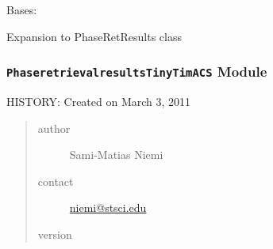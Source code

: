 \documentclass[letterpaper,10pt,english]{sphinxmanual}
\begin{document}
\begin{fulllineitems}
\label{SamPy.focus:SamPy.focus.PhaseretrievalresultsTinyTim.TinyTimResults}
Bases: 

Expansion to PhaseRetResults class


\begin{fulllineitems}
\label{SamPy.focus:SamPy.focus.PhaseretrievalresultsTinyTim.TinyTimResults.findRealFocus}
\end{fulllineitems}



\begin{fulllineitems}
\label{SamPy.focus:SamPy.focus.PhaseretrievalresultsTinyTim.TinyTimResults.plotFocusDifference}
\end{fulllineitems}



\begin{fulllineitems}
\label{SamPy.focus:SamPy.focus.PhaseretrievalresultsTinyTim.TinyTimResults.plotFocusFieldPosition}
\end{fulllineitems}


\end{fulllineitems}



\subsubsection{\texttt{PhaseretrievalresultsTinyTimACS} Module}
\label{SamPy.focus:phaseretrievalresultstinytimacs-module}\label{SamPy.focus:module-SamPy.focus.PhaseretrievalresultsTinyTimACS}
HISTORY:
Created on March 3, 2011
\begin{quote}\begin{description}
\item[{author}] \leavevmode
Sami-Matias Niemi

\item[{contact}] \leavevmode
\href{mailto:niemi@stsci.edu}{niemi@stsci.edu}

\item[{version}] 

\end{description}\end{quote}
\end{document}
